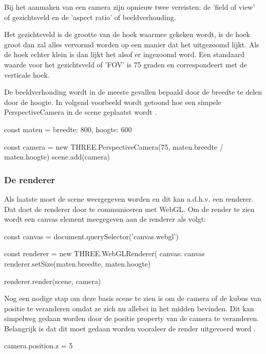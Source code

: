 Bij het aanmaken van een camera zijn opnieuw twee vereisten: de 'field of view' of gezichtsveld en de 'aspect ratio' of beeldverhouding. 

Het gezichtsveld is de grootte van de hoek waarmee gekeken wordt, is de hoek groot dan zal alles vervormd worden op een manier dat het uitgezoomd lijkt. Als de hoek echter klein is dan lijkt het alsof er ingezoomd word. Een standaard waarde voor het gezichtsveld of 'FOV' is 75 graden en correspondeert met de verticale hoek.

De beeldverhouding wordt in de meeste gevallen bepaald door de breedte te delen door de hoogte. In volgend voorbeeld wordt getoond hoe een simpele PerspectiveCamera in de scene geplaatst wordt \autocite{Simon2023}.

\begin{LVerbatim}
const maten = {
	breedte: 800,
	hoogte: 600
}

const camera = new THREE.PerspectiveCamera(75, maten.breedte / maten.hoogte)
scene.add(camera)
\end{LVerbatim}

\subsubsection{De renderer}

Als laatste moet de scene weergegeven worden en dit kan a.d.h.v. een renderer. Dat doet de renderer door te communiceren met WebGL. Om de render te zien wordt een canvas element meegegeven aan de renderer als volgt: 

\begin{LVerbatim}
const canvas = document.querySelector('canvas.webgl')

const renderer = new THREE.WebGLRenderer({
	canvas: canvas
}
renderer.setSize(maten.breedte, maten.hoogte)

renderer.render(scene, camera)
\end{LVerbatim}

Nog een nodige stap om deze basis scene te zien is om de camera of de kubus van positie te veranderen omdat ze zich nu allebei in het midden bevinden. Dit kan simpelweg gedaan worden door de positie property van de camera te veranderen. Belangrijk is dat dit moet gedaan worden vooraleer de render uitgevoerd word \autocite{Simon2023}.

\begin{LVerbatim}

camera.position.z = 5

\end{LVerbatim}

